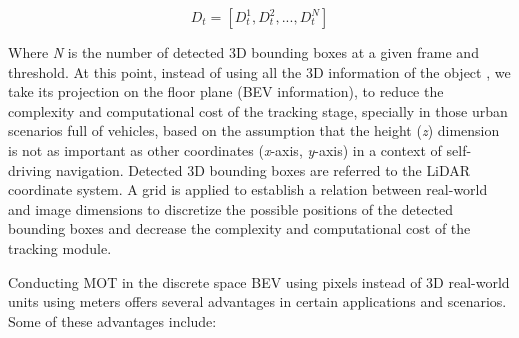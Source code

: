 \begin{equation}
	\label{eq:4_smartmot_detection}
	D_{t} =[D_{t}^{1},D_{t}^{2}, ...,D_{t}^{N}]
\end{equation}

Where \textit{N} is the number of detected 3D bounding boxes at a given frame and threshold. At this point, instead of using all the 3D information of the object \cite{chiu2021probabilistic, weng20203d}, we take its projection on the floor plane (\ac{BEV} information), to reduce the complexity and computational cost of the tracking stage, specially in those urban scenarios full of vehicles, based on the assumption that the height (\textit{z}) dimension is not as important as other coordinates (\textit{x}-axis, \textit{y}-axis) in a context of self-driving navigation. Detected 3D bounding boxes are referred to the \ac{LiDAR} coordinate system. A grid is applied to establish a relation between real-world and image dimensions to discretize the possible positions of the detected bounding boxes and decrease the complexity and computational cost of the tracking module. 

Conducting \ac{MOT} in the discrete space \ac{BEV} using pixels instead of 3D real-world units using meters offers several advantages in certain applications and scenarios. Some of these advantages include:

